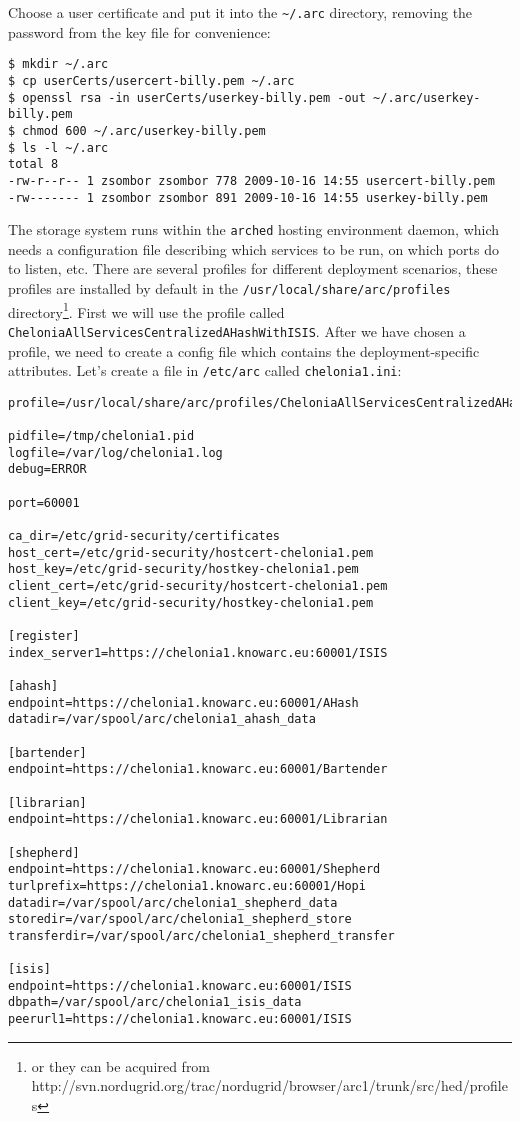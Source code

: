 \documentclass{article}
\begin{document}
Choose a user certificate and put it into the \verb!~/.arc! directory, removing the password from the key file for convenience:

\begin{verbatim}
$ mkdir ~/.arc
$ cp userCerts/usercert-billy.pem ~/.arc
$ openssl rsa -in userCerts/userkey-billy.pem -out ~/.arc/userkey-billy.pem
$ chmod 600 ~/.arc/userkey-billy.pem
$ ls -l ~/.arc
total 8
-rw-r--r-- 1 zsombor zsombor 778 2009-10-16 14:55 usercert-billy.pem
-rw------- 1 zsombor zsombor 891 2009-10-16 14:55 userkey-billy.pem
\end{verbatim}

The storage system runs within the \verb!arched! hosting environment daemon, which needs a configuration file describing which services to be run, on which ports do to listen, etc. There are several profiles for different deployment scenarios, these profiles are installed by default in the \verb!/usr/local/share/arc/profiles! directory\footnote{or they can be acquired from http://svn.nordugrid.org/trac/nordugrid/browser/arc1/trunk/src/hed/profiles}. First we will use the profile called \verb!CheloniaAllServicesCentralizedAHashWithISIS!. After we have chosen a profile, we need to create a config file which contains the deployment-specific attributes. Let's create a file in \verb!/etc/arc! called \verb!chelonia1.ini!:

\begin{verbatim}
profile=/usr/local/share/arc/profiles/CheloniaAllServicesCentralizedAHashWithISIS.xml

pidfile=/tmp/chelonia1.pid
logfile=/var/log/chelonia1.log
debug=ERROR

port=60001

ca_dir=/etc/grid-security/certificates
host_cert=/etc/grid-security/hostcert-chelonia1.pem
host_key=/etc/grid-security/hostkey-chelonia1.pem
client_cert=/etc/grid-security/hostcert-chelonia1.pem
client_key=/etc/grid-security/hostkey-chelonia1.pem

[register]
index_server1=https://chelonia1.knowarc.eu:60001/ISIS

[ahash]
endpoint=https://chelonia1.knowarc.eu:60001/AHash
datadir=/var/spool/arc/chelonia1_ahash_data

[bartender]
endpoint=https://chelonia1.knowarc.eu:60001/Bartender

[librarian]
endpoint=https://chelonia1.knowarc.eu:60001/Librarian

[shepherd]
endpoint=https://chelonia1.knowarc.eu:60001/Shepherd
turlprefix=https://chelonia1.knowarc.eu:60001/Hopi
datadir=/var/spool/arc/chelonia1_shepherd_data
storedir=/var/spool/arc/chelonia1_shepherd_store
transferdir=/var/spool/arc/chelonia1_shepherd_transfer

[isis]
endpoint=https://chelonia1.knowarc.eu:60001/ISIS
dbpath=/var/spool/arc/chelonia1_isis_data
peerurl1=https://chelonia1.knowarc.eu:60001/ISIS
\end{verbatim}
\end{document}
